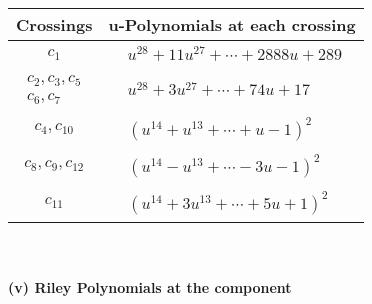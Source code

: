 \documentclass[1p]{elsarticle_modified}
\theoremstyle{definition}
\begin{document}
\begin{tabular}{m{50pt}|m{274pt}}
Crossings & \hspace{64pt}u-Polynomials at each crossing \\
\hline $$\begin{aligned}c_{1}\end{aligned}$$&$\begin{aligned}
&u^{28}+11 u^{27}+\cdots+2888 u+289
\end{aligned}$\\
\hline $$\begin{aligned}c_{2},c_{3},c_{5}\\c_{6},c_{7}\end{aligned}$$&$\begin{aligned}
&u^{28}+3 u^{27}+\cdots+74 u+17
\end{aligned}$\\
\hline $$\begin{aligned}c_{4},c_{10}\end{aligned}$$&$\begin{aligned}
&(u^{14}+u^{13}+\cdots+u-1)^{2}
\end{aligned}$\\
\hline $$\begin{aligned}c_{8},c_{9},c_{12}\end{aligned}$$&$\begin{aligned}
&(u^{14}- u^{13}+\cdots-3 u-1)^{2}
\end{aligned}$\\
\hline $$\begin{aligned}c_{11}\end{aligned}$$&$\begin{aligned}
&(u^{14}+3 u^{13}+\cdots+5 u+1)^{2}
\end{aligned}$\\
\hline
\end{tabular}\\~\\
\newpage\renewcommand{\arraystretch}{1}
\flushleft \textbf{(v) Riley Polynomials at the component}\newline \\
\end{document}
